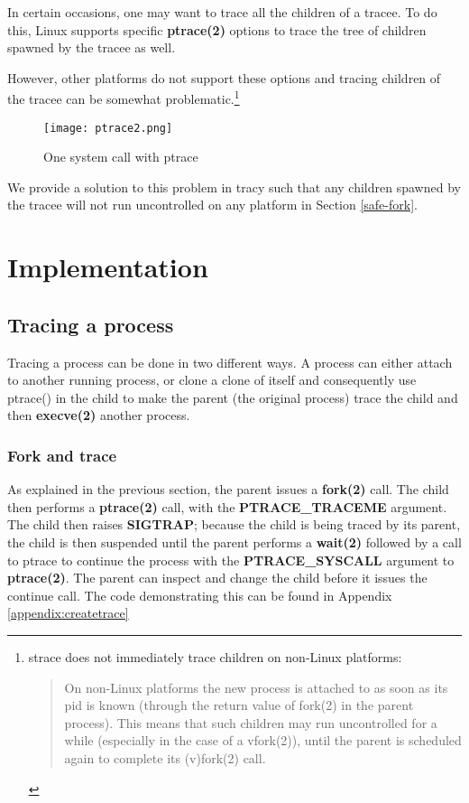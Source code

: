 \documentclass[a4paper, 10pt]{report}
\begin{document}
In certain occasions, one may want to trace all the children of a tracee.
To do this, Linux supports specific \textbf{ptrace(2)} options to trace
the tree of children spawned by the tracee as well.

However, other platforms do not support these options and tracing
children of the tracee can be somewhat problematic.\footnote{strace does not
immediately trace children on non-Linux platforms:
\begin{quote}
    On non-Linux platforms the new process is attached to as soon as its pid is
    known (through the return value of fork(2) in the parent process).
    This means that such children may run uncontrolled for a while
    (especially in the case of a vfork(2)), until the parent is scheduled
    again to complete its (v)fork(2)  call.
\end{quote}
}

\begin{figure}
\label{fig2}
\texttt{[image: ptrace2.png]}
\caption{One system call with ptrace}
\end{figure}

We provide a solution to this problem in tracy such that any children spawned
by the tracee will not run uncontrolled on any platform in Section \ref{safe-fork}.


\chapter{Implementation}

\section{Tracing a process}

Tracing a process can be done in two different ways. A process can either attach
to another running process, or clone a clone of itself and consequently  use
ptrace() in the child to make the parent (the original process) trace the child
and then \textbf{execve(2)} another process.

\subsection{Fork and trace}

As explained in the previous section, the parent issues a \textbf{fork(2)} call.
The child then performs a \textbf{ptrace(2)} call, with the
\textbf{PTRACE\_TRACEME} argument. The child then raises \textbf{SIGTRAP};
because the child is being traced by its parent, the child is then suspended
until the parent performs a \textbf{wait(2)} followed by a call to ptrace to
continue the process with the \textbf{PTRACE\_SYSCALL} argument to
\textbf{ptrace(2)}. The parent can inspect and change the child before it issues
the continue call. The code demonstrating this can be found in
Appendix \ref{appendix:createtrace}
\end{document}
